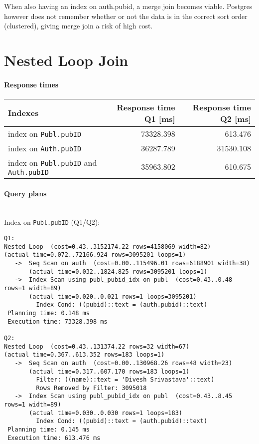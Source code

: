 \documentclass[11pt]{scrartcl}
\begin{document}
When also having an index on auth.pubid, a merge join becomes viable. Postgres however does not
remember whether or not the data is in the correct sort order (clustered), giving merge join a risk
of high cost.
\section{Nested Loop Join}

\paragraph{Response times}

\begin{flushleft}
\begin{tabular}{l|r|r}
  Indexes & Response time Q1 [ms] & Response time Q2 [ms] \\
  \hline
  index on {\tt Publ.pubID} & 73328.398 & 613.476  \\
  index on {\tt Auth.pubID} & 36287.789 & 31530.108 \\
  index on {\tt Publ.pubID} and {\tt Auth.pubID} & 35963.802 & 610.675 \\
\end{tabular}
\end{flushleft}

\paragraph{Query plans}\mbox{}\\ 

\noindent Index on {\tt Publ.pubID} (Q1/Q2):
{\small
\begin{verbatim}
Q1:
Nested Loop  (cost=0.43..3152174.22 rows=4158069 width=82)
(actual time=0.072..72166.924 rows=3095201 loops=1)
   ->  Seq Scan on auth  (cost=0.00..115496.01 rows=6188901 width=38)
       (actual time=0.032..1824.825 rows=3095201 loops=1)
   ->  Index Scan using publ_pubid_idx on publ  (cost=0.43..0.48 rows=1 width=89)
       (actual time=0.020..0.021 rows=1 loops=3095201)
         Index Cond: ((pubid)::text = (auth.pubid)::text)
 Planning time: 0.148 ms
 Execution time: 73328.398 ms

Q2:
Nested Loop  (cost=0.43..131374.22 rows=32 width=67)
(actual time=0.367..613.352 rows=183 loops=1)
   ->  Seq Scan on auth  (cost=0.00..130968.26 rows=48 width=23)
       (actual time=0.317..607.170 rows=183 loops=1)
         Filter: ((name)::text = 'Divesh Srivastava'::text)
         Rows Removed by Filter: 3095018
   ->  Index Scan using publ_pubid_idx on publ  (cost=0.43..8.45 rows=1 width=89)
       (actual time=0.030..0.030 rows=1 loops=183)
         Index Cond: ((pubid)::text = (auth.pubid)::text)
 Planning time: 0.145 ms
 Execution time: 613.476 ms
\end{verbatim}
}
\end{document}
